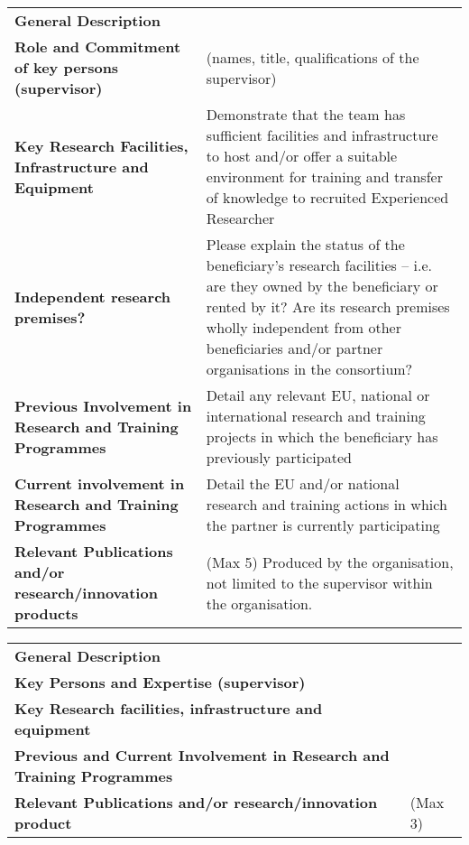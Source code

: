 \documentclass[a4paper,11pt]{article}
\begin{document}
{\fontsize{9bp}{1em}\selectfont %
\noindent\begin{tabular}{>{\raggedright}p{}p{}}
  \multicolumn{2}{l}{\textbf{Beneficiary X}} \\\midrule
\textbf{General Description} &

\\\midrule
\textbf{Role and Commitment of key persons (supervisor)} &
(names, title, qualifications of the supervisor)

\\\midrule
\textbf{Key Research Facilities, Infrastructure and Equipment} &
Demonstrate that the team has sufficient facilities and infrastructure to host and/or offer a suitable environment for training and transfer of knowledge to recruited Experienced Researcher
\\\midrule
\textbf{Independent research premises?} &
Please explain the status of the beneficiary's research facilities – i.e. are they owned by the beneficiary or rented by it? Are its research premises wholly independent from other beneficiaries and/or partner organisations in the consortium?
\\\midrule
\textbf{Previous Involvement in Research and Training Programmes} &
Detail any relevant EU, national or international research and training projects in which the beneficiary has previously participated
\\\midrule
\textbf{Current involvement in Research and Training Programmes} &
Detail the EU and/or national research and training actions in which the partner is currently participating
\\\midrule
\textbf{Relevant Publications and/or research/innovation products} &
(Max 5) Produced by the organisation, not limited to the supervisor within the organisation.
\\\bottomrule
\end{tabular}}
\vspace{\baselineskip}

{\fontsize{9bp}{1em}\selectfont
\noindent\begin{tabular}{>{\raggedright}p{}p{}}
  \multicolumn{2}{l}{\textbf{Partner Organisation Y}} \\\midrule
\textbf{General Description} &

\\\midrule
\textbf{Key Persons and Expertise (supervisor)} &

\\\midrule
\textbf{Key Research facilities, infrastructure and equipment} &

\\\midrule
\textbf{Previous and Current Involvement in Research and Training Programmes} &

\\\midrule
\textbf{Relevant Publications and/or research/innovation product} &
(Max 3)
\\\bottomrule
\end{tabular}}
\end{document}
